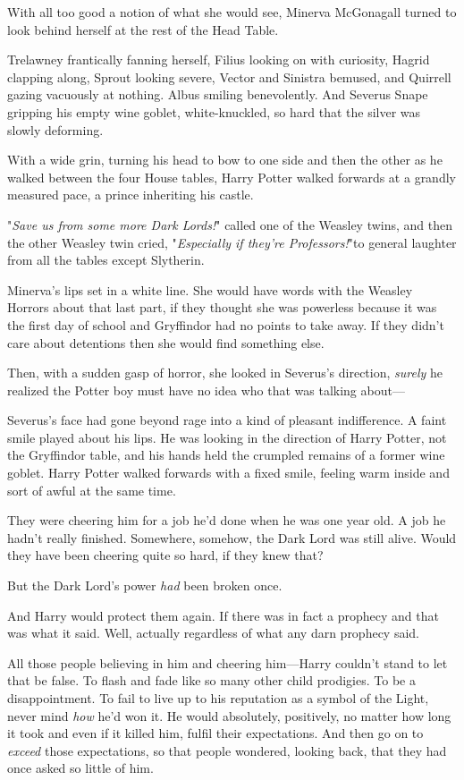 With all too good a notion of what she would see, Minerva McGonagall turned to
look behind herself at the rest of the Head Table.

Trelawney frantically fanning herself, Filius looking on with curiosity, Hagrid
clapping along, Sprout looking severe, Vector and Sinistra bemused, and
Quirrell gazing vacuously at nothing. Albus smiling benevolently. And Severus
Snape gripping his empty wine goblet, white-knuckled, so hard that the silver
was slowly deforming.

With a wide grin, turning his head to bow to one side and then the other as he
walked between the four House tables, Harry Potter walked forwards at a grandly
measured pace, a prince inheriting his castle.

"\emph{Save us from some more Dark Lords!}" called one of the Weasley twins,
and then the other Weasley twin cried, "\emph{Especially if they're
Professors!}"to general laughter from all the tables except Slytherin.

Minerva's lips set in a white line. She would have words with the Weasley
Horrors about that last part, if they thought she was powerless because it was
the first day of school and Gryffindor had no points to take away. If they
didn't care about detentions then she would find something else.

Then, with a sudden gasp of horror, she looked in Severus's direction,
\emph{surely} he realized the Potter boy must have no idea who that was talking
about---

Severus's face had gone beyond rage into a kind of pleasant indifference. A
faint smile played about his lips. He was looking in the direction of Harry
Potter, not the Gryffindor table, and his hands held the crumpled remains of a
former wine goblet.
\later
Harry Potter walked forwards with a fixed smile, feeling warm inside and sort
of awful at the same time.

They were cheering him for a job he'd done when he was one year old. A job he
hadn't really finished. Somewhere, somehow, the Dark Lord was still alive.
Would they have been cheering quite so hard, if they knew that?

But the Dark Lord's power \emph{had} been broken once.

And Harry would protect them again. If there was in fact a prophecy and that
was what it said. Well, actually regardless of what any darn prophecy said.

All those people believing in him and cheering him---Harry couldn't stand to
let that be false. To flash and fade like so many other child prodigies. To be
a disappointment. To fail to live up to his reputation as a symbol of the
Light, never mind \emph{how} he'd won it. He would absolutely, positively,
no matter how long it took and even if it killed him, fulfil their
expectations. And then go on to \emph{exceed} those expectations, so that
people wondered, looking back, that they had once asked so little of him.

